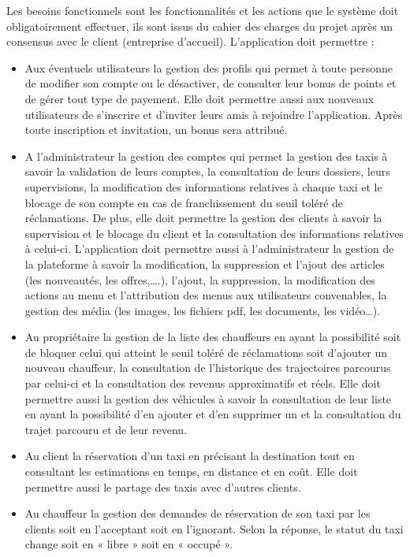 {Les besoins fonctionnels sont les fonctionnalités et les actions que le système doit obligatoirement effectuer, ils sont issus du cahier des charges du projet après un consensus avec le client (entreprise d'accueil). L'application doit permettre :\\

\begin{itemize}
\item Aux éventuels utilisateurs la gestion des profils qui permet à toute personne de modifier son compte ou le désactiver, de consulter leur bonus de points et de gérer tout type de payement. Elle doit permettre aussi aux nouveaux utilisateurs de s'inscrire et  d'inviter leurs amis à rejoindre l'application. Après toute inscription et invitation, un bonus sera attribué. 
\item A l'administrateur la gestion des comptes qui permet la gestion des taxis à savoir la validation de leurs comptes, la consultation de leurs dossiers, leurs supervisions, la modification des informations relatives à chaque taxi et le blocage de son compte  en cas de franchissement du seuil toléré de réclamations. De plus, elle doit permettre la gestion des clients à savoir la supervision et le blocage du client et la consultation des informations relatives à celui-ci. L'application doit permettre aussi à l'administrateur  la gestion de la plateforme à savoir la modification, la suppression et l'ajout des articles (les nouveautés, les offres,….), l'ajout, la suppression, la modification des actions au menu et l'attribution des menus aux utilisateurs convenables, la gestion des média (les images, les fichiers pdf, les documents, les vidéo…).
\item Au propriétaire la gestion de la liste des chauffeurs en ayant la possibilité soit de bloquer celui qui atteint le seuil toléré de réclamations soit d'ajouter un nouveau chauffeur, la consultation de l'historique des trajectoires parcourus par celui-ci et la consultation des revenus approximatifs et réels. Elle doit permettre aussi la gestion des véhicules à savoir la consultation de leur liste en ayant la possibilité d'en ajouter et d'en supprimer  un et la consultation du trajet parcouru et de leur revenu.
\item Au client la réservation d'un taxi en précisant la destination tout en consultant les estimations en temps, en distance et en coût. Elle doit permettre aussi le partage des taxis avec d'autres clients.
\item Au chauffeur la gestion des demandes de réservation de son taxi par les clients soit en l'acceptant soit en l'ignorant. Selon la réponse, le statut du taxi change soit en « libre » soit en « occupé ».
\end{itemize}

}
